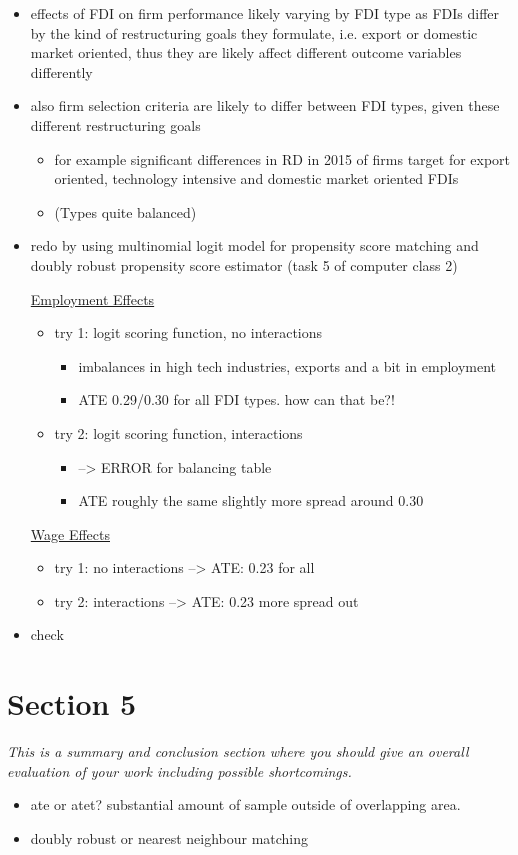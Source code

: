 \documentclass[11pt,a4paper,leqno]{article}
\begin{document}
\begin{itemize}
	\item effects of FDI on firm performance likely varying by FDI type as FDIs differ by the kind of restructuring goals they formulate, i.e. export or domestic market oriented, thus they are likely affect different outcome variables differently
	\item also firm selection criteria are likely to differ between FDI types, given these different restructuring goals 
	\begin{itemize}
		\item for example significant differences in RD in 2015 of firms target for export oriented, technology intensive and domestic market oriented FDIs
		\item (Types quite balanced)
	\end{itemize}
	\item redo by using multinomial logit model for propensity score matching and doubly robust propensity score estimator (task 5 of computer class 2)
	
	\underline{Employment Effects}
	\begin{itemize}
		\item try 1: logit scoring function, no interactions
		\begin{itemize}
			\item imbalances in high tech industries, exports and a bit in employment
			\item ATE 0.29/0.30 for all FDI types. how can that be?!
		\end{itemize}
		\item try 2: logit scoring function, interactions 
		\begin{itemize}
			\item --> ERROR for balancing table
			\item ATE roughly the same slightly more spread around 0.30
		\end{itemize}	 
	\end{itemize}

	\underline{Wage Effects}
	\begin{itemize}
		\item try 1: no interactions --> ATE: 0.23 for all
		\item try 2: interactions --> ATE: 0.23 more spread out
	\end{itemize}
	\item check 
\end{itemize}

\section*{Section 5} 
\textit{This is a summary and conclusion section where you should give an overall evaluation of your work including possible shortcomings.}
\begin{itemize}
	\item ate or atet? substantial amount of sample outside of overlapping area. 
	\item doubly robust or nearest neighbour matching
\end{itemize}
\end{document}
